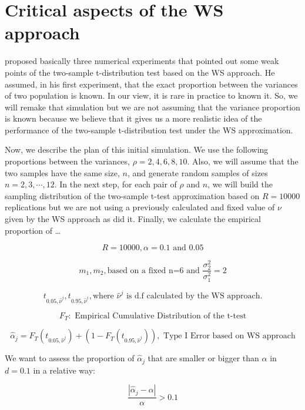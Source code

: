 \documentclass[
  authoryear,
  preprint,
  3p]{elsarticle}
\begin{document}
\section{Critical aspects of the WS
approach}\label{critical-aspects-of-the-ws-approach}

\citet{lloyd_2-sample_2013} proposed basically three numerical
experiments that pointed out some weak points of the two-sample
t-distribution test based on the WS approach. He assumed, in his first
experiment, that the exact proportion between the variances of two
population is known. In our view, it is rare in practice to known it.
So, we will remake that simulation but we are not assuming that the
variance proportion is known because we believe that it gives us a more
realistic idea of the performance of the two-sample t-distribution test
under the WS approximation.

Now, we describe the plan of this initial simulation. We use the
following proportions between the variances, \(\rho = 2,4,6,8,10\).
Also, we will assume that the two samples have the same size, \(n\), and
generate random samples of sizes \(n = 2,3,\cdots,12\). In the next
step, for each pair of \(\rho\) and \(n\), we will build the sampling
distribution of the two-sample t-test approximation based on \(R=10000\)
replications but we are not using a previously calculated and fixed
value of \(\nu\) given by the WS approach as \citet{lloyd_2-sample_2013}
did it. Finally, we calculate the empirical proportion of \ldots{}

\[R = 10000, \alpha = 0.1 \text{ and } 0.05\]

\[m_1,m_2 , \text{based on a fixed n=6 and } \frac{\sigma_2^2}{\sigma_1^2} = 2\]

\[t_{0.05,\hat{\nu}^j}, t_{0.95,\hat{\nu}^j},\text{where } \hat{\nu}^j \text{ is d.f calculated by the WS approach.}\]

\[F_{T}: \text{\ Empirical Cumulative Distribution of the t-test}\]

\[\hat{\alpha}_j = F_{T}(t_{0.05,\hat{\nu}^j}) + ( 1 - F_{T}( t_{0.95,\hat{\nu}^j})), \text{\ Type I Error based on WS approach}\]

We want to assess the proportion of \(\hat{\alpha}_j\) that are smaller
or bigger than \(\alpha\) in \(d=0.1\) in a relative way:

\[\frac{|\hat{\alpha}_j - \alpha|}{\alpha} > 0.1\]
\end{document}
